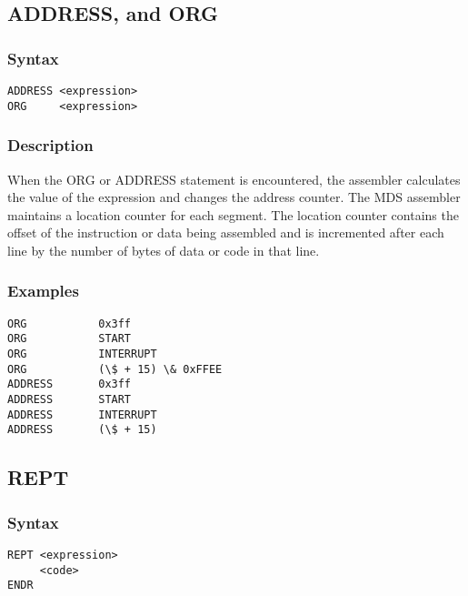     \subsection{ADDRESS, and ORG}
        \subsubsection{Syntax}
            \verb'ADDRESS <expression>'\\
            \verb'ORG     <expression>'

        \subsubsection{Description}
            When the ORG or ADDRESS statement is encountered, the assembler calculates the value of the expression and changes the address counter. The MDS assembler maintains a location counter for each segment. The location counter contains the offset of the instruction or data being assembled and is incremented after each line by the number of bytes of data or code in that line.

        \subsubsection{Examples}
            \verb'ORG           0x3ff'\\
            \verb'ORG           START'\\
            \verb'ORG           INTERRUPT'\\
            \verb'ORG           (\$ + 15) \& 0xFFEE'\\
            \verb'ADDRESS       0x3ff'\\
            \verb'ADDRESS       START'\\
            \verb'ADDRESS       INTERRUPT'\\
            \verb'ADDRESS       (\$ + 15)'

    \subsection{REPT}
        \subsubsection{Syntax}
            \verb'REPT <expression>'\\
            \verb'     <code>'\\
            \verb'ENDR'

